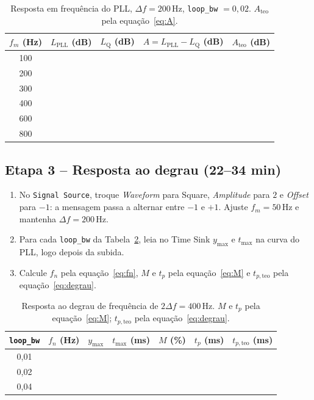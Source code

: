 \documentclass[11pt,a4paper]{article}
\begin{document}
\begin{table}[H]
  \centering
  \begin{tabular}{c c c c c}
    \toprule
    $f_m$ (Hz) & $L_\text{PLL}$ (dB) & $L_\text{Q}$ (dB) & $A = L_\text{PLL} - L_\text{Q}$ (dB) & $A_\text{teo}$ (dB) \\
    \midrule
    100 & & & & \\
    200 & & & & \\
    300 & & & & \\
    400 & & & & \\
    600 & & & & \\
    800 & & & & \\
    \bottomrule
  \end{tabular}
  \caption{Resposta em frequência do PLL, $\Delta f = 200$\,Hz,
    \texttt{loop\_bw} $= 0{,}02$. $A_\text{teo}$ pela equação~\eqref{eq:A}.}
  \label{tab:H}
\end{table}

\subsection*{Etapa 3 -- Resposta ao degrau (22--34 min)}

\begin{instrucao}
\begin{enumerate}[label=\arabic*.]
  \item No \texttt{Signal Source}, troque \textit{Waveform} para Square,
    \textit{Amplitude} para $2$ e \textit{Offset} para $-1$: a mensagem passa
    a alternar entre $-1$ e $+1$. Ajuste $f_m = 50$\,Hz e mantenha
    $\Delta f = 200$\,Hz.
  \item Para cada \texttt{loop\_bw} da Tabela~\ref{tab:degrau}, leia no Time
    Sink $y_\text{max}$ e $t_\text{max}$ na curva do PLL, logo depois da subida.
  \item Calcule $f_n$ pela equação~\eqref{eq:fn}, $M$ e $t_p$ pela
    equação~\eqref{eq:M} e $t_{p,\text{teo}}$ pela equação~\eqref{eq:degrau}.
\end{enumerate}
\end{instrucao}

\begin{table}[H]
  \centering\small
  \begin{tabular}{c c c c c c c}
    \toprule
    \texttt{loop\_bw} & $f_n$ (Hz) & $y_\text{max}$ & $t_\text{max}$ (ms) & $M$ (\%) & $t_p$ (ms) & $t_{p,\text{teo}}$ (ms) \\
    \midrule
    0,01 & & & & & & \\
    0,02 & & & & & & \\
    0,04 & & & & & & \\
    \bottomrule
  \end{tabular}
  \caption{Resposta ao degrau de frequência de $2\Delta f = 400$\,Hz.
    $M$ e $t_p$ pela equação~\eqref{eq:M}; $t_{p,\text{teo}}$ pela
    equação~\eqref{eq:degrau}.}
  \label{tab:degrau}
\end{table}
\end{document}
